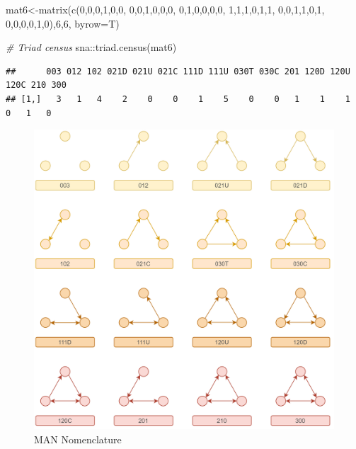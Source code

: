 \documentclass[
  notitlepage,
  onecolumn,
  openany]{book}
\newenvironment{Shaded}{\begin{snugshade}}{\end{snugshade}}
\newcommand{\AttributeTok}[1]{\textcolor[rgb]{0.77,0.63,0.00}{#1}}
\newcommand{\CommentTok}[1]{\textcolor[rgb]{0.56,0.35,0.01}{\textit{#1}}}
\newcommand{\DecValTok}[1]{\textcolor[rgb]{0.00,0.00,0.81}{#1}}
\newcommand{\FunctionTok}[1]{\textcolor[rgb]{0.00,0.00,0.00}{#1}}
\newcommand{\NormalTok}[1]{#1}
\newcommand{\OtherTok}[1]{\textcolor[rgb]{0.56,0.35,0.01}{#1}}
\newcommand{\SpecialCharTok}[1]{\textcolor[rgb]{0.00,0.00,0.00}{#1}}
\begin{document}
\begin{Shaded}
\begin{Highlighting}[]
\NormalTok{mat6}\OtherTok{\textless{}{-}}\FunctionTok{matrix}\NormalTok{(}\FunctionTok{c}\NormalTok{(}\DecValTok{0}\NormalTok{,}\DecValTok{0}\NormalTok{,}\DecValTok{0}\NormalTok{,}\DecValTok{1}\NormalTok{,}\DecValTok{0}\NormalTok{,}\DecValTok{0}\NormalTok{,}
               \DecValTok{0}\NormalTok{,}\DecValTok{0}\NormalTok{,}\DecValTok{1}\NormalTok{,}\DecValTok{0}\NormalTok{,}\DecValTok{0}\NormalTok{,}\DecValTok{0}\NormalTok{,}
               \DecValTok{0}\NormalTok{,}\DecValTok{1}\NormalTok{,}\DecValTok{0}\NormalTok{,}\DecValTok{0}\NormalTok{,}\DecValTok{0}\NormalTok{,}\DecValTok{0}\NormalTok{,}
               \DecValTok{1}\NormalTok{,}\DecValTok{1}\NormalTok{,}\DecValTok{1}\NormalTok{,}\DecValTok{0}\NormalTok{,}\DecValTok{1}\NormalTok{,}\DecValTok{1}\NormalTok{,}
               \DecValTok{0}\NormalTok{,}\DecValTok{0}\NormalTok{,}\DecValTok{1}\NormalTok{,}\DecValTok{1}\NormalTok{,}\DecValTok{0}\NormalTok{,}\DecValTok{1}\NormalTok{,}
               \DecValTok{0}\NormalTok{,}\DecValTok{0}\NormalTok{,}\DecValTok{0}\NormalTok{,}\DecValTok{0}\NormalTok{,}\DecValTok{1}\NormalTok{,}\DecValTok{0}\NormalTok{),}\DecValTok{6}\NormalTok{,}\DecValTok{6}\NormalTok{, }\AttributeTok{byrow=}\NormalTok{T)}

\CommentTok{\# Triad census}
\NormalTok{sna}\SpecialCharTok{::}\FunctionTok{triad.census}\NormalTok{(mat6)}
\end{Highlighting}
\end{Shaded}

\begin{verbatim}
##      003 012 102 021D 021U 021C 111D 111U 030T 030C 201 120D 120U 120C 210 300
## [1,]   3   1   4    2    0    0    1    5    0    0   1    1    1    0   1   0
\end{verbatim}

\begin{figure}[h!]

{\centering \includegraphics[width=0.8\linewidth]{images/12-Reciprocity and transitivity/MAN} 

}

\caption{MAN Nomenclature}\label{fig:unnamed-chunk-102}
\end{figure}
\end{document}
